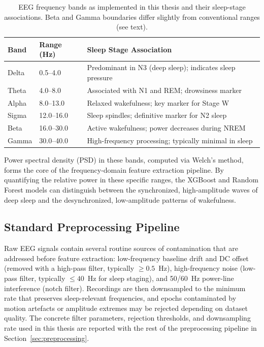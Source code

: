 \begin{table}[htbp]
\centering
\caption[EEG frequency bands as used in this thesis]{EEG frequency bands
as implemented in this thesis and their sleep-stage associations.
Beta and Gamma boundaries differ slightly from conventional ranges
(see text).}
\label{tab:eeg_bands}
\begin{tabular}{lll}
\toprule
\textbf{Band} & \textbf{Range (Hz)} & \textbf{Sleep Stage Association} \\
\midrule
Delta & 0.5--4.0 & Predominant in N3 (deep sleep); indicates sleep pressure \\
Theta & 4.0--8.0 & Associated with N1 and REM; drowsiness marker \\
Alpha & 8.0--13.0 & Relaxed wakefulness; key marker for Stage W \\
Sigma & 12.0--16.0 & Sleep spindles; definitive marker for N2 sleep \\
Beta & 16.0--30.0 & Active wakefulness; power decreases during NREM \\
Gamma & 30.0--40.0 & High-frequency processing; typically minimal in sleep \\
\bottomrule
\end{tabular}
\end{table}

Power spectral density (PSD) in these bands, computed via Welch's method, forms the core of the frequency-domain feature extraction pipeline. By quantifying the relative power in these specific ranges, the XGBoost and Random Forest models can distinguish between the synchronized, high-amplitude waves of deep sleep and the desynchronized, low-amplitude patterns of wakefulness.

\subsection{Standard Preprocessing Pipeline}

Raw EEG signals contain several routine sources of contamination that are
addressed before feature extraction: low-frequency baseline drift and DC
offset (removed with a high-pass filter, typically $\geq 0.5$~Hz),
high-frequency noise (low-pass filter, typically $\leq 40$~Hz for sleep
staging), and 50/60~Hz power-line interference (notch filter). Recordings
are then downsampled to the minimum rate that preserves sleep-relevant
frequencies, and epochs contaminated by motion artefacts or amplitude
extremes may be rejected depending on dataset quality. The concrete filter
parameters, rejection thresholds, and downsampling rate used in this thesis
are reported with the rest of the preprocessing pipeline in
Section~\ref{sec:preprocessing}.

